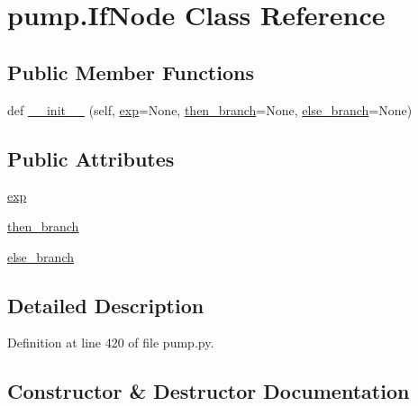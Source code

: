 \hypertarget{classpump_1_1_if_node}{}\section{pump.\+If\+Node Class Reference}
\label{classpump_1_1_if_node}
\subsection*{Public Member Functions}
\begin{DoxyCompactItemize}
\item 
def \hyperlink{classpump_1_1_if_node_ab8bff21c18d60b461f7b6fa9dfa59f7c}{\+\_\+\+\_\+init\+\_\+\+\_\+} (self, \hyperlink{classpump_1_1_if_node_a92042e4262196ffd7366350539f512d8}{exp}=None, \hyperlink{classpump_1_1_if_node_aa9e2e488564629f8dc0d64d165a19ffa}{then\+\_\+branch}=None, \hyperlink{classpump_1_1_if_node_a12e422b16ed4291f15cd95cd6e7f81eb}{else\+\_\+branch}=None)
\end{DoxyCompactItemize}
\subsection*{Public Attributes}
\begin{DoxyCompactItemize}
\item 
\hyperlink{classpump_1_1_if_node_a92042e4262196ffd7366350539f512d8}{exp}
\item 
\hyperlink{classpump_1_1_if_node_aa9e2e488564629f8dc0d64d165a19ffa}{then\+\_\+branch}
\item 
\hyperlink{classpump_1_1_if_node_a12e422b16ed4291f15cd95cd6e7f81eb}{else\+\_\+branch}
\end{DoxyCompactItemize}


\subsection{Detailed Description}


Definition at line 420 of file pump.\+py.



\subsection{Constructor \& Destructor Documentation}
